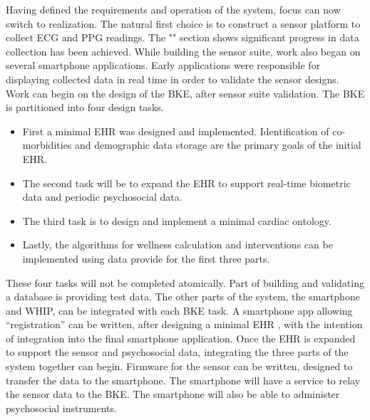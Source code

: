 Having defined the requirements and operation of the system, focus can now switch to realization. The natural first choice is to construct a sensor platform to collect ECG and PPG readings. The "" section shows significant progress in data collection has been achieved. While building the sensor suite, work also began on several smartphone applications. Early applications were responsible for displaying collected data in real time in order to validate the sensor designs. Work can begin on the design of the BKE, after sensor suite validation. The BKE is partitioned into four design tasks. 
\begin{itemize}
\item First a minimal EHR was designed and implemented. Identification of co-morbidities and demographic data storage are the primary goals of the initial EHR.
\item The second task will be to expand the EHR to support real-time biometric data and periodic psychosocial data. 
\item The third task is to design and implement a minimal cardiac ontology.
\item Lastly, the algorithms for wellness calculation and interventions can be implemented using data provide for the first three parts.
\end{itemize}
These four tasks will not be completed atomically. Part of building and validating a database is providing test data. The other parts of the system, the smartphone and WHIP, can be integrated with each BKE task. A smartphone app allowing “registration” can be written, after designing a minimal EHR , with the intention of integration into the final smartphone application. Once the EHR is expanded to support the sensor and psychosocial data, integrating the three parts of the system together can begin. Firmware for the sensor can be written, designed to transfer the data to the smartphone.  The smartphone will have a service to relay the sensor data to the BKE. The smartphone will also be able to administer psychosocial instruments. 
